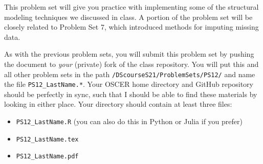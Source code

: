 \documentclass[12pt,english]{exam}
\begin{document}
This problem set will give you practice with implementing some of the structural modeling techniques we discussed in class. A portion of the problem set will be closely related to Problem Set 7, which introduced methods for imputing missing data.

As with the previous problem sets, you will submit this problem set by pushing the document to \emph{your} (private) fork of the class repository. You will put this and all other problem sets in the path \texttt{/DScourseS21/ProblemSets/PS12/} and name the file \texttt{PS12\_LastName.*}. Your OSCER home directory and GitHub repository should be perfectly in sync, such that I should be able to find these materials by looking in either place. Your directory should contain at least three files:
\begin{itemize}
    \item \texttt{PS12\_LastName.R} (you can also do this in Python or Julia if you prefer)
    \item \texttt{PS12\_LastName.tex}
    \item \texttt{PS12\_LastName.pdf}
\end{itemize}
\end{document}

